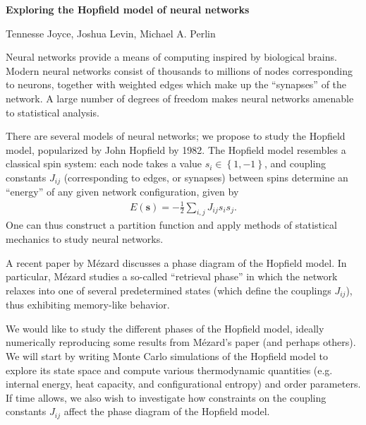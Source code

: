 \documentclass[12pt]{revtex4-1}
\begin{document}
\begin{center}
  \large \bf Exploring the Hopfield model of neural networks
\end{center}

\begin{center}
  Tennesse Joyce, Joshua Levin, Michael A. Perlin
\end{center}

Neural networks provide a means of computing inspired by biological
brains. Modern neural networks consist of thousands to millions of
nodes corresponding to neurons, together with weighted edges which
make up the ``synapses'' of the network. A large number of degrees of
freedom makes neural networks amenable to statistical analysis.

There are several models of neural networks; we propose to study the
Hopfield model, popularized by John Hopfield by 1982. The Hopfield
model resembles a classical spin system: each node takes a value
$s_i\in\left\{1,-1\right\}$, and coupling constants $J_{ij}$
(corresponding to edges, or synapses) between spins determine an
``energy'' of any given network configuration, given by
\begin{align}
  E(\bm s) = -\frac12\sum_{i,j} J_{ij}s_is_j.
\end{align}
One can thus construct a partition function and apply methods of
statistical mechanics to study neural networks.

A recent paper by M\'ezard\cite{mezard2017mean} discusses a phase
diagram of the Hopfield model. In particular, M\'ezard studies a
so-called ``retrieval phase'' in which the network relaxes into one of
several predetermined states (which define the couplings $J_{ij}$),
thus exhibiting memory-like behavior.

We would like to study the different phases of the Hopfield model,
ideally numerically reproducing some results from M\'ezard's paper
(and perhaps others)\cite{amit1985storing,tanaka1998mean}. We will
start by writing Monte Carlo simulations of the Hopfield model to
explore its state space and compute various thermodynamic quantities
(e.g. internal energy, heat capacity, and configurational entropy) and
order parameters. If time allows, we also wish to investigate how
constraints on the coupling constants $J_{ij}$ affect the phase
diagram of the Hopfield model.


\end{document}
